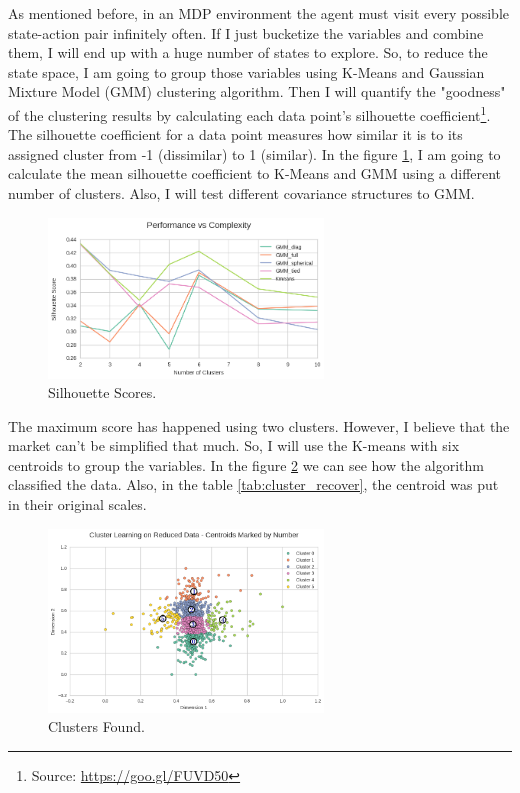 \documentclass[a4paper]{article}
\begin{document}
As mentioned before, in an MDP environment the agent must visit every possible state-action pair infinitely often. If I just bucketize the variables and combine them, I will end up with a huge number of states to explore. So, to reduce the state space, I am going to group those variables using K-Means and Gaussian Mixture Model (GMM) clustering algorithm. Then I will quantify the "goodness" of the clustering results by calculating each data point's silhouette coefficient\footnote{Source: \url{https://goo.gl/FUVD50}}. The silhouette coefficient for a data point measures how similar it is to its assigned cluster from -1 (dissimilar) to 1 (similar). In the figure \ref{fig:scores}, I am going to calculate the mean silhouette coefficient to K-Means and GMM using a different number of clusters. Also, I will test different covariance structures to GMM.

\begin{figure}[ht]
\centering
\includegraphics[width=0.65\textwidth]{figures/cluster_scores.png}
\caption{\label{fig:scores}Silhouette Scores.}
\end{figure}

The maximum score has happened using two clusters. However, I believe that the market can't be simplified that much. So, I will use the K-means with six centroids to group the variables. In the figure \ref{fig:clusters} we can see how the algorithm classified the data. Also, in the table \ref{tab:cluster_recover}, the centroid was put in their original scales.

\begin{figure}[ht]
\centering
\includegraphics[width=0.65\textwidth]{figures/cluster_scatter.png}
\caption{\label{fig:clusters}Clusters Found.}
\end{figure}
\end{document}
